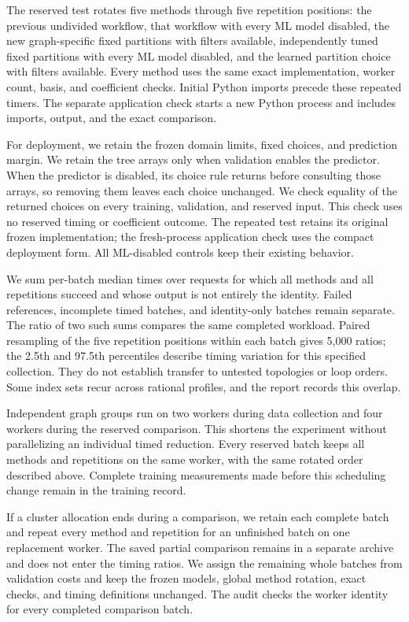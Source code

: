 The reserved test rotates five methods through five repetition positions:
the previous undivided workflow, that workflow with every ML model disabled,
the new graph-specific fixed partitions with filters available, independently
tuned fixed partitions with every ML model disabled, and the learned
partition choice with filters available. Every method uses the same exact
implementation, worker count, basis, and coefficient checks. Initial Python
imports precede these repeated timers. The separate application check starts
a new Python process and includes imports, output, and the exact comparison.

For deployment, we retain the frozen domain limits, fixed choices, and
prediction margin. We retain the tree arrays only when validation enables
the predictor. When the predictor is disabled, its choice rule returns
before consulting those arrays, so removing them leaves each choice
unchanged. We check equality of the returned choices on every training,
validation, and reserved input. This check uses no reserved timing or
coefficient outcome. The repeated test retains its original frozen
implementation; the fresh-process application check uses the compact
deployment form. All ML-disabled controls keep their existing behavior.

We sum per-batch median times over requests for which all methods and all
repetitions succeed and whose output is not entirely the identity. Failed
references, incomplete timed batches, and identity-only batches remain
separate. The ratio of two such sums compares the same completed workload.
Paired resampling of the five repetition positions within each batch gives
5,000 ratios; the 2.5th and 97.5th percentiles describe timing variation for
this specified collection. They do not establish transfer to untested
topologies or loop orders. Some index sets recur across rational profiles,
and the report records this overlap.

Independent graph groups run on two workers during data collection and
four workers during the reserved comparison. This shortens
the experiment without parallelizing an individual timed reduction.
Every reserved batch keeps all methods and repetitions on the same worker,
with the same rotated order described above. Complete training measurements
made before this scheduling change remain in the training record.

If a cluster allocation ends during a comparison, we retain each complete
batch and repeat every method and repetition for an unfinished batch on
one replacement worker. The saved partial comparison remains in a separate
archive and does not enter the timing ratios. We assign the remaining whole
batches from validation costs and keep the frozen models, global method
rotation, exact checks, and timing definitions unchanged. The audit checks
the worker identity for every completed comparison batch.
